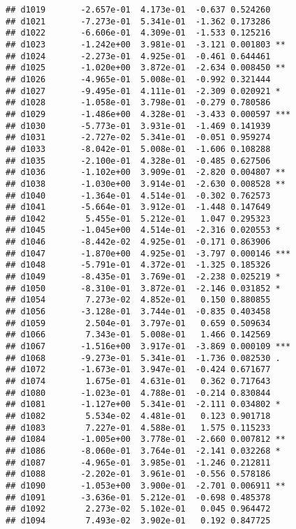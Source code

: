 \documentclass[
]{article}
\begin{document}
\begin{verbatim}
## d1019       -2.657e-01  4.173e-01  -0.637 0.524260    
## d1021       -7.273e-01  5.341e-01  -1.362 0.173286    
## d1022       -6.606e-01  4.309e-01  -1.533 0.125216    
## d1023       -1.242e+00  3.981e-01  -3.121 0.001803 ** 
## d1024       -2.273e-01  4.925e-01  -0.461 0.644461    
## d1025       -1.020e+00  3.872e-01  -2.634 0.008450 ** 
## d1026       -4.965e-01  5.008e-01  -0.992 0.321444    
## d1027       -9.495e-01  4.111e-01  -2.309 0.020921 *  
## d1028       -1.058e-01  3.798e-01  -0.279 0.780586    
## d1029       -1.486e+00  4.328e-01  -3.433 0.000597 ***
## d1030       -5.773e-01  3.931e-01  -1.469 0.141939    
## d1031       -2.727e-02  5.341e-01  -0.051 0.959274    
## d1033       -8.042e-01  5.008e-01  -1.606 0.108288    
## d1035       -2.100e-01  4.328e-01  -0.485 0.627506    
## d1036       -1.102e+00  3.909e-01  -2.820 0.004807 ** 
## d1038       -1.030e+00  3.914e-01  -2.630 0.008528 ** 
## d1040       -1.364e-01  4.514e-01  -0.302 0.762573    
## d1041       -5.664e-01  3.912e-01  -1.448 0.147649    
## d1042        5.455e-01  5.212e-01   1.047 0.295323    
## d1045       -1.045e+00  4.514e-01  -2.316 0.020553 *  
## d1046       -8.442e-02  4.925e-01  -0.171 0.863906    
## d1047       -1.870e+00  4.925e-01  -3.797 0.000146 ***
## d1048       -5.791e-01  4.372e-01  -1.325 0.185326    
## d1049       -8.435e-01  3.769e-01  -2.238 0.025219 *  
## d1050       -8.310e-01  3.872e-01  -2.146 0.031852 *  
## d1054        7.273e-02  4.852e-01   0.150 0.880855    
## d1056       -3.128e-01  3.744e-01  -0.835 0.403458    
## d1059        2.504e-01  3.797e-01   0.659 0.509634    
## d1066        7.343e-01  5.008e-01   1.466 0.142569    
## d1067       -1.516e+00  3.917e-01  -3.869 0.000109 ***
## d1068       -9.273e-01  5.341e-01  -1.736 0.082530 .  
## d1072       -1.673e-01  3.947e-01  -0.424 0.671677    
## d1074        1.675e-01  4.631e-01   0.362 0.717643    
## d1080       -1.023e-01  4.788e-01  -0.214 0.830844    
## d1081       -1.127e+00  5.341e-01  -2.111 0.034802 *  
## d1082        5.534e-02  4.481e-01   0.123 0.901718    
## d1083        7.227e-01  4.588e-01   1.575 0.115233    
## d1084       -1.005e+00  3.778e-01  -2.660 0.007812 ** 
## d1086       -8.060e-01  3.764e-01  -2.141 0.032268 *  
## d1087       -4.965e-01  3.985e-01  -1.246 0.212811    
## d1088       -2.202e-01  3.961e-01  -0.556 0.578186    
## d1090       -1.053e+00  3.900e-01  -2.701 0.006911 ** 
## d1091       -3.636e-01  5.212e-01  -0.698 0.485378    
## d1092        2.273e-02  5.102e-01   0.045 0.964472    
## d1094        7.493e-02  3.902e-01   0.192 0.847725    

\end{verbatim}
\end{document}
